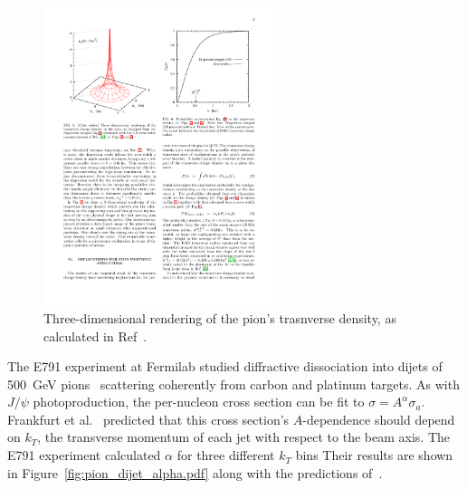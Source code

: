 \begin{figure}[!h]
    \centering
    \includegraphics[width=0.6\textwidth]{chap2/pion_charge_density.pdf}
    \caption{Three-dimensional rendering of the pion's trasnverse density, as
             calculated in Ref~\cite{Miller_2011}.
            }
    \label{fig:pion_charge_density}
\end{figure}


The E791 experiment at Fermilab studied diffractive dissociation into dijets of
\SI{500}{\giga\electronvolt} pions~\cite{Aitala_2001_1, Aitala_2001_2}
scattering coherently from carbon and platinum targets.
As with $J/\psi$ photoproduction, the per-nucleon cross section can be fit to
$\sigma = A^\alpha\sigma_a$.
Frankfurt et al.~\cite{Frankfurt_1993} predicted that this cross section's
$A$-dependence should depend on $k_T$, the transverse momentum of each jet with
respect to the beam axis.
The E791 experiment calculated $\alpha$ for three different $k_T$ bins
Their results are shown in Figure~\ref{fig:pion_dijet_alpha.pdf} along with the
predictions of~\cite{Frankfurt_1993}.

